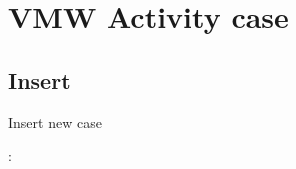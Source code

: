 \documentclass[letterpaper,10pt,english,openany,oneside]{sphinxmanual}
\begin{document}
\section{VMW Activity case}
\label{\detokenize{api/v4:vmw-activity-case}}

\subsection{Insert}
\label{\detokenize{api/v4:id1}}

\begin{fulllineitems}
\label{\detokenize{api/v4:post--api4-Reports-vmw_activity_cases}}
\sphinxAtStartPar
Insert new case

\sphinxAtStartPar
{}:


\end{fulllineitems}
\end{document}
